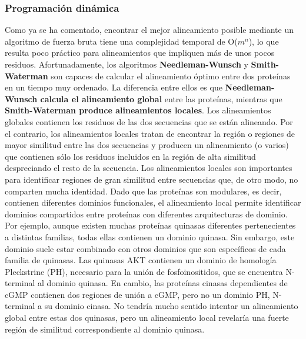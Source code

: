 \subsubsection{Programación dinámica}
Como ya se ha comentado, encontrar el mejor alineamiento posible mediante un algoritmo de fuerza bruta tiene una complejidad temporal de O($m^n$), lo que resulta poco práctico para alineamientos que impliquen más de unos pocos residuos. Afortunadamente, los algoritmos \textbf{Needleman-Wunsch} y \textbf{Smith- Waterman} son capaces de calcular el alineamiento óptimo entre dos proteínas en un tiempo muy ordenado. La diferencia entre ellos es que \textbf{Needleman-Wunsch calcula el alineamiento global} entre las proteínas, mientras que \textbf{Smith-Waterman produce alineamientos locales}. Los alineamientos globales contienen los residuos de las dos secuencias que se están alineando. Por el contrario, los alineamientos locales tratan de encontrar la región o regiones de mayor similitud entre las dos secuencias y producen un alineamiento (o varios) que contienen sólo los residuos incluidos en la región de alta similitud despreciando el resto de la secuencia. Los alineamientos locales son importantes para identificar regiones de gran similitud entre secuencias que, de otro modo, no comparten mucha identidad. Dado que las proteínas son modulares, es decir, contienen diferentes dominios funcionales, el alineamiento local permite identificar dominios compartidos entre proteínas con diferentes arquitecturas de dominio. Por ejemplo, aunque existen muchas proteínas quinasas diferentes pertenecientes a distintas familias, todas ellas contienen un dominio quinasa. Sin embargo, este dominio suele estar combinado con otros dominios que son específicos de cada familia de quinasas. Las quinasas AKT contienen un dominio de homología Pleckstrine (PH), necesario para la unión de fosfoinositidos, que se encuentra N-terminal al dominio quinasa. En cambio, las proteínas cinasas dependientes de cGMP contienen dos regiones de unión a cGMP, pero no un dominio PH, N-terminal a su dominio cinasa. No tendría mucho sentido intentar un alineamiento global entre estas dos quinasas, pero un alineamiento local revelaría una fuerte región de similitud correspondiente al dominio quinasa. 

